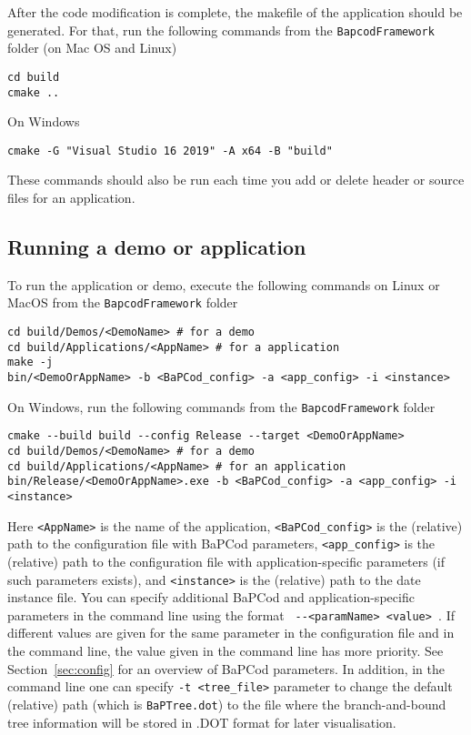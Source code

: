 \documentclass[10pt,a4paper]{article}
\newcommand{\bc}{BaPCod\xspace}
\begin{document}
After the code modification is complete, the makefile of the application should be generated. For that, run the
following commands from the \verb+BapcodFramework+ folder (on Mac OS and Linux)
\begin{Verbatim}
cd build
cmake ..
\end{Verbatim}
On Windows
\begin{Verbatim}
cmake -G "Visual Studio 16 2019" -A x64 -B "build"
\end{Verbatim}

These commands should also be run each time you add or delete header or source files for an application.

\subsection{Running a demo or application}
\label{sec:launchapp}  

To run the application or demo, execute the following commands on Linux or MacOS from the \verb+BapcodFramework+ folder
\begin{Verbatim}
cd build/Demos/<DemoName> # for a demo
cd build/Applications/<AppName> # for a application
make -j
bin/<DemoOrAppName> -b <BaPCod_config> -a <app_config> -i <instance> 
\end{Verbatim}

On Windows, run the following commands from the \verb+BapcodFramework+ folder
\begin{Verbatim}
cmake --build build --config Release --target <DemoOrAppName>
cd build/Demos/<DemoName> # for a demo
cd build/Applications/<AppName> # for an application
bin/Release/<DemoOrAppName>.exe -b <BaPCod_config> -a <app_config> -i <instance> 
\end{Verbatim}

Here \verb+<AppName>+ is the name of the application, \verb+<BaPCod_config>+ is the (relative) path to the
configuration file with BaPCod parameters, \verb+<app_config>+ is the (relative) path to the configuration file with
application-specific parameters (if such parameters exists), and \verb+<instance>+ is the (relative) path to the date
instance file. You can specify additional \bc and application-specific parameters in the command line using the format
\verb+ --<paramName> <value> +. If different values are given for the same parameter in the configuration file and in
the command line, the value given in the command line has more priority. See Section~\ref{sec:config} for an overview of
\bc parameters. In addition, in the command line one can specify \verb+-t <tree_file>+ parameter to change the
default (relative) path (which is \verb+BaPTree.dot+) to the file where the branch-and-bound tree information will be
stored in .DOT format for later visualisation.
\end{document}
